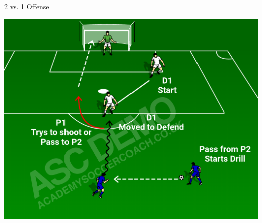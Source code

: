 \begin{evenBlock}{2 vs. 1 Offense}


\begin{minipage}[t]{\linewidth}
    \centering
    
    \begin{minipage}{.3\linewidth} %
            \includegraphics[width=\textwidth]{../img/Trimmed/2v1_Option}

            \vspace{3pt}
            

\end{minipage}
\end{minipage}
\end{evenBlock}
